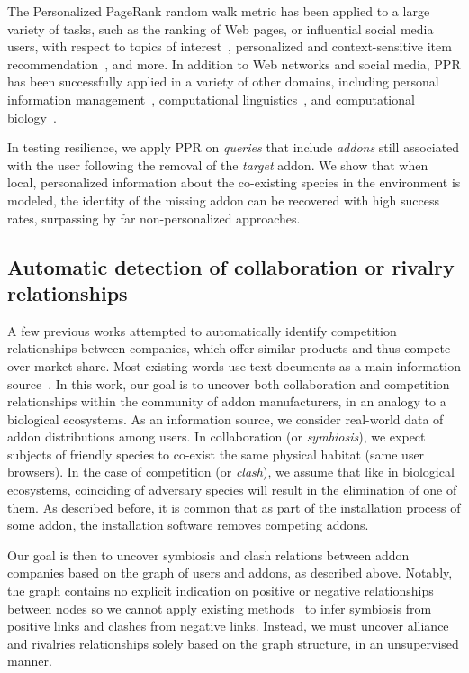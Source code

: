\documentclass[ijoc,nonblindrev]{informs3} %
\numberwithin{equation}{subsection}
\begin{document}
The Personalized PageRank random walk metric has been applied to a large variety of tasks, such as the ranking of Web pages, or influential social media users, with respect to topics of interest~\citep{haveliwala2003topic,weng2010twitterrank}, personalized and context-sensitive item  recommendation~\citep{lee2011random,bagciKAIS16}, and more. In addition to Web networks and social media, PPR has been successfully applied in a variety of other domains, including personal information management~\citep{minkov2010improving}, computational linguistics~\citep{agirreEACL09}, and computational biology~\citep{freschi2007protein}.

In testing resilience, we apply PPR on {\it queries} that include {\it addons} still associated with the user following the removal of the {\it target} addon. We show that when local, personalized information about the co-existing species in the environment is modeled, the identity of the missing addon can be recovered with high success rates, surpassing by far non-personalized approaches. 

\subsection{Automatic detection of collaboration or rivalry relationships}

A few previous works attempted to automatically identify competition relationships between companies, which offer similar products and thus compete over market share. Most existing words use text documents as a main information source~\citep{baoTKDE08,yangCIKM12}. In this work, our goal is to uncover both collaboration and competition relationships within the community of addon manufacturers, in an analogy to a biological ecosystems. As an information source, we consider real-world data of addon distributions among users. In collaboration (or \emph{symbiosis}), we expect subjects of friendly species to co-exist the same physical habitat (same user browsers). In the case of competition (or \emph{clash}), we assume that like in biological ecosystems, coinciding of adversary species will result in the elimination of one of them. As described before, it is common that as part of the installation process of some addon, the installation software removes competing addons. 

Our goal is then to uncover symbiosis and clash relations between addon companies based on the graph of users and addons, as described above. Notably, the graph contains no explicit indication on positive or negative relationships between nodes so we cannot apply existing methods~\citep{kunegisWWW08,kerchoveICDM08} to infer symbiosis from positive links and clashes from negative links. Instead, we must uncover alliance and rivalries relationships solely based on the graph structure, in an unsupervised manner. 
\end{document}
